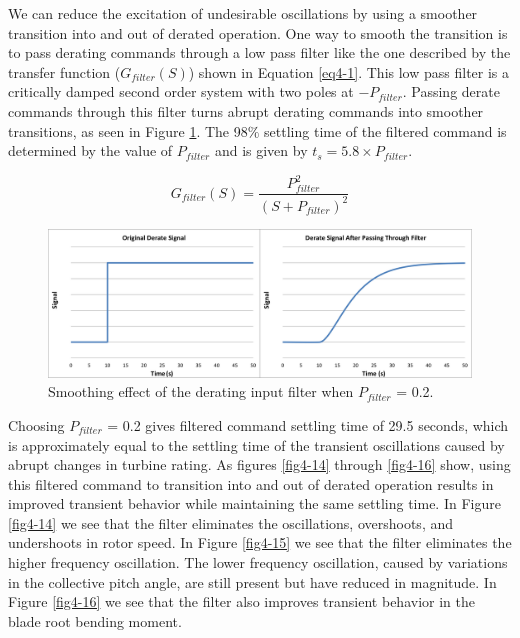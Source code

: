 We can reduce the excitation of undesirable oscillations by using a smoother transition into and out of derated operation. One way to smooth the transition is to pass derating commands through a low pass filter like the one described by the transfer function ($G_{filter}(S)$) shown in Equation \ref{eq4-1}. This low pass filter is a critically damped second order system with two poles at $-P_{filter}$. Passing derate commands through this filter turns abrupt derating commands into smoother transitions, as seen in Figure \ref{fig4-13}. The 98$\%$ settling time of the filtered command is determined by the value of $P_{filter}$ and is given by $t_s = 5.8\times P_{filter}$.

\begin{equation}
	G_{filter}(S)=\dfrac{P_{filter}^2}{(S+P_{filter})^2} \label{eq4-1}
\end{equation}

\begin{figure}[htb]
	\centering
		\includegraphics[width = \linewidth]{Figures/ch4Figures/fig4-13.png}
	\caption{Smoothing effect of the derating input filter when $P_{filter}$  = 0.2.}
	\label{fig4-13}
\end{figure}

Choosing $P_{filter}$ = 0.2 gives filtered command settling time of 29.5 seconds, which is approximately equal to the settling time of the transient oscillations caused by abrupt changes in turbine rating. As figures \ref{fig4-14} through \ref{fig4-16} show, using this filtered command to transition into and out of derated operation results in improved transient behavior while maintaining the same settling time. In Figure \ref{fig4-14} we see that the filter eliminates the oscillations, overshoots, and undershoots in rotor speed. In Figure \ref{fig4-15} we see that the filter eliminates the higher frequency oscillation. The lower frequency oscillation, caused by variations in the collective pitch angle, are still present but have reduced in magnitude. In Figure \ref{fig4-16} we see that the filter also improves transient behavior in the blade root bending moment.

